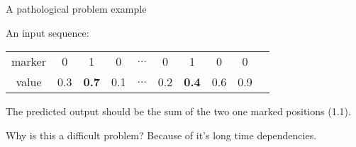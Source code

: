 \begin{frame}{A pathological problem example}


An input sequence:

\vspace{1em}

\begin{tabular}{|c|c|c|c|c|c|c|c|c|c}
	\hline  marker & 0&  1&  0&  $\hdots$& 0 & 1 & 0 & 0  \\ 
	  value & 0.3&  \textbf{0.7}&  0.1&  $\hdots$& 0.2& \textbf{0.4} & 0.6& 0.9  \\ 
	\hline 
\end{tabular}

\vspace{1em}
The predicted output should be the sum of the two one marked positions (1.1). 
\pause
\vspace{1em}
\begin{block}{Why is this a difficult problem?}
	Because of it's long time dependencies.
\end{block}

\end{frame}

